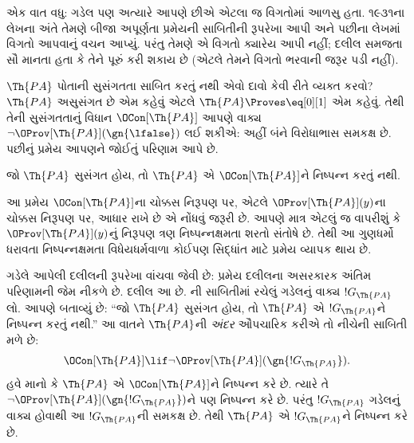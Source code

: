 \begin{digress}
એક વાત વધુ: ગડેલ પણ
અત્યારે આપણે છીએ એટલા
જ વિગતોમાં આળસુ હતા.
૧૯૩૧ના લેખના અંતે તેમણે
બીજા અપૂર્ણતા પ્રમેયની
સાબિતીની રૂપરેખા આપી
અને પછીના લેખમાં વિગતો
આપવાનું વચન આપ્યું.
પરંતુ તેમણે એ વિગતો
ક્યારેય આપી નહીં;
દલીલ સમજતા સૌ માનતા
હતા કે તેને પૂરું કરી
શકાય છે (એટલે તેમને
વિગતો ભરવાની જરૂર
પડી નહીં).
\end{digress}
\endgroup


\begingroup
\makeatletter{}\makeatother


\label{guunit:OLP-0319}


$\Th{PA}$ પોતાની સુસંગતતા સાબિત કરતું નથી એવો દાવો કેવી રીતે વ્યક્ત કરવો? $\Th{PA}$ અસુસંગત છે એમ કહેવું એટલે $\Th{PA} \Proves \eq[0][1]$ એમ કહેવું. તેથી તેની સુસંગતતાનું વિધાન $\OCon[\Th{PA}]$ આપણે વાક્ય $\lnot\OProv[\Th{PA}](\gn{\lfalse})$ લઈ શકીએ: અહીં બંને વિરોધાભાસ સમકક્ષ છે. પછીનું પ્રમેય આપણને જોઈતું પરિણામ આપે છે.

\begin{thm}
જો $\Th{PA}$ સુસંગત હોય, તો $\Th{PA}$ એ $\OCon[\Th{PA}]$ને નિષ્પન્ન કરતું નથી.
\end{thm}

આ પ્રમેય $\OCon[\Th{PA}]$ના ચોક્કસ નિરૂપણ પર, એટલે $\OProv[\Th{PA}](y)$ના ચોક્કસ નિરૂપણ પર, આધાર રાખે છે એ નોંધવું જરૂરી છે. આપણે માત્ર એટલું જ વાપરીશું કે $\OProv[\Th{PA}](y)$નું નિરૂપણ ત્રણ નિષ્પન્નક્ષમતા શરતો સંતોષે છે. તેથી આ ગુણધર્મો ધરાવતા નિષ્પન્નક્ષમતા વિધેયધર્મવાળા કોઈપણ સિદ્ધાંત માટે પ્રમેય વ્યાપક થાય છે.

ગડેલે આપેલી દલીલની રૂપરેખા વાંચવા જેવી છે: પ્રમેય દલીલના અસરકારક અંતિમ પરિણામની જેમ નીકળે છે. દલીલ આ છે. ની સાબિતીમાં રચેલું ગડેલનું વાક્ય $!G_\Th{PA}$ લો. આપણે બતાવ્યું છે: ``જો $\Th{PA}$ સુસંગત હોય, તો $\Th{PA}$ એ $!G_\Th{PA}$ને નિષ્પન્ન કરતું નથી.'' આ વાતને $\Th{PA}$ની \emph{અંદર} ઔપચારિક કરીએ તો નીચેની સાબિતી મળે છે:
\[
\OCon[\Th{PA}] \lif \lnot \OProv[\Th{PA}](\gn{!G_\Th{PA}}).
\]
હવે માનો કે $\Th{PA}$ એ $\OCon[\Th{PA}]$ને નિષ્પન્ન કરે છે. ત્યારે તે $\lnot\OProv[\Th{PA}](\gn{!G_\Th{PA}})$ને પણ નિષ્પન્ન કરે છે. પરંતુ $!G_\Th{PA}$ ગડેલનું વાક્ય હોવાથી આ $!G_\Th{PA}$ની સમકક્ષ છે. તેથી $\Th{PA}$ એ $!G_\Th{PA}$ને નિષ્પન્ન કરે છે.

